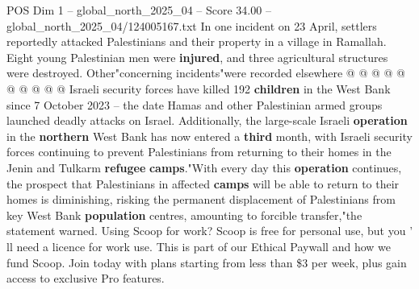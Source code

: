 \begin{textsample}{POS Dim 1 – global\_north\_2025\_04 – Score 34.00 – global\_north\_2025\_04/124005167.txt}
In one incident on 23 April, settlers reportedly attacked Palestinians and their property in a village in Ramallah.
Eight young Palestinian men were \textbf{injured}, and three agricultural structures were destroyed.
Other"concerning incidents"were recorded elsewhere @ @ @ @ @ @ @ @ @ @ Israeli security forces have killed 192 \textbf{children} in the West Bank since 7 October 2023 -- the date Hamas and other Palestinian armed groups launched deadly attacks on Israel.
Additionally, the large-scale Israeli \textbf{operation} in the \textbf{northern} West Bank has now entered a \textbf{third} month, with Israeli security forces continuing to prevent Palestinians from returning to their homes in the Jenin and Tulkarm \textbf{refugee} \textbf{camps}."With every day this \textbf{operation} continues, the prospect that Palestinians in affected \textbf{camps} will be able to return to their homes is diminishing, risking the permanent displacement of Palestinians from key West Bank \textbf{population} centres, amounting to forcible transfer,"the statement warned.
Using Scoop for work?
Scoop is free for personal use, but you ' ll need a licence for work use.
This is part of our Ethical Paywall and how we fund Scoop.
Join today with plans starting from less than \$3 per week, plus gain access to exclusive Pro features.

\end{textsample}
